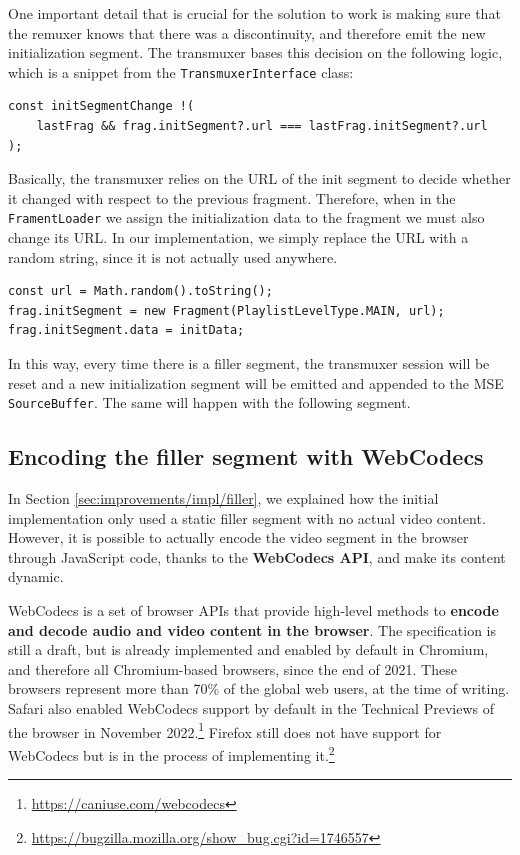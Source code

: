 One important detail that is crucial for the solution to work is making sure that the remuxer knows that there was a discontinuity, and therefore emit the new initialization segment. The transmuxer bases this decision on the following logic, which is a snippet from the \texttt{TransmuxerInterface} class:

\begin{verbatim}
const initSegmentChange !(
    lastFrag && frag.initSegment?.url === lastFrag.initSegment?.url
);
\end{verbatim}

Basically, the transmuxer relies on the URL of the init segment to decide whether it changed with respect to the previous fragment. Therefore, when in the \texttt{FramentLoader} we assign the initialization data to the fragment we must also change its URL. In our implementation, we simply replace the URL with a random string, since it is not actually used anywhere.

\begin{verbatim}
const url = Math.random().toString();
frag.initSegment = new Fragment(PlaylistLevelType.MAIN, url);
frag.initSegment.data = initData;
\end{verbatim}

In this way, every time there is a filler segment, the transmuxer session will be reset and a new initialization segment will be emitted and appended to the MSE \texttt{SourceBuffer}. The same will happen with the following segment.

\subsection{Encoding the filler segment with WebCodecs}
\label{sec:improvements/impl/webcodecs}

In Section \ref{sec:improvements/impl/filler}, we explained how the initial implementation only used a static filler segment with no actual video content. However, it is possible to actually encode the video segment in the browser through JavaScript code, thanks to the \textbf{WebCodecs API}, and make its content dynamic.

WebCodecs is a set of browser APIs that provide high-level methods to \textbf{encode and decode audio and video content in the browser}. The specification is still a draft, but is already implemented and enabled by default in Chromium, and therefore all Chromium-based browsers, since the end of 2021. These browsers represent more than 70\% of the global web users, at the time of writing. Safari also enabled WebCodecs support by default in the Technical Previews of the browser in November 2022.\footnote{\url{https://caniuse.com/webcodecs}} Firefox still does not have support for WebCodecs but is in the process of implementing it.\footnote{\url{https://bugzilla.mozilla.org/show_bug.cgi?id=1746557}}

